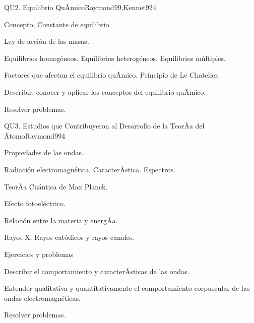 \begin{syllabus}
\begin{unit}{QU2. Equilibrio QuÃ­mico}{Raymond99,Kennet92}{4}
\begin{topics}
      \item Concepto. Constante de equilibrio.
      \item Ley de acción de las masas.
      \item Equilibrios homogéneos. Equilibrios heterogéneos. Equilibrios múltiples.
      \item Factores que afectan el equilibrio quÃ­mico. Principio de Le Chatelier.
    \end{topics}
   \begin{unitgoals}
      \item Describir, conocer y aplicar los conceptos del equilibrio quÃ­mico.
      \item Resolver problemas.
   \end{unitgoals}
\end{unit}

\begin{unit}{QU3. Estudios que Contribuyeron al Desarrollo de la TeorÃ­a del Ãtomo}{Raymond99}{4}
\begin{topics}
      \item Propiedades de las ondas.
      \item Radiación electromagnética. CaracterÃ­stica. Espectros.
      \item TeorÃ­a Cuántica de Max Planck.
      \item Efecto fotoeléctrico.
      \item Relación entre la materia y energÃ­a.
      \item Rayos X, Rayos catódicos y rayos canales.
      \item Ejercicios y problemas
\end{topics}

   \begin{unitgoals}
      \item Describir el comportamiento y caracterÃ­sticas de las ondas.
      \item Entender qualitativa y quantitativamente el comportamiento corpuscular de las ondas electromagnéticas.
      \item Resolver problemas.
   \end{unitgoals}
\end{unit}


\end{syllabus}
